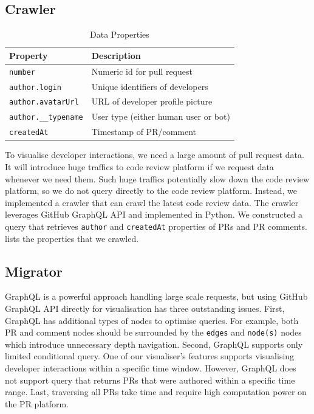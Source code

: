 \documentclass[sigconf]{acmart}
\begin{document}
\subsection{Crawler}
\label{sec:crawler}

\vspace{-0.2cm}
\begin{table}[h]
	\caption{Data Properties}
  \vspace{-0.2cm}
	\label{table:properties}
	\centering
	\scriptsize
	\begin{tabularx}{\linewidth}{|l|X|}
		\hline
    Property & Description \\
		\hline
    {\tt number} & Numeric id for pull request \\
    {\tt author.login} & Unique identifiers of developers \\
    {\tt author.avatarUrl} & URL of developer profile picture \\
    {\tt author.\_\_typename} & User type (either human user or bot) \\
    {\tt createdAt} & Timestamp of PR/comment \\
		\hline
	\end{tabularx}
\end{table}
\vspace{-0.2cm}

To visualise developer interactions, we need a large amount of pull request data.
It will introduce huge traffics to code review platform if we request data whenever we need them.
Such huge traffics potentially slow down the code review platform, so we do not query directly to the code review platform.
Instead, we implemented a crawler that can crawl the latest code review data.
The crawler leverages GitHub GraphQL API and implemented in Python.
We constructed a query that retrieves {\tt author} and {\tt createdAt} properties of PRs and PR comments.
 lists the properties that we crawled.


\subsection{Migrator}
\label{sec:migrator}

GraphQL is a powerful approach handling large scale requests, but using GitHub GraphQL API directly for visualisation has three outstanding issues.
First, GraphQL has additional types of nodes to optimise queries.
For example, both PR and comment nodes should be surrounded by the {\tt edges} and {\tt node(s)} nodes which introduce unnecessary depth navigation.
Second, GraphQL supports only limited conditional query.
One of our visualiser's features supports visualising developer interactions within a specific time window.
However, GraphQL does not support query that returns PRs that were authored within a specific time range.
Last, traversing all PRs take time and require high computation power on the PR platform.
\end{document}
